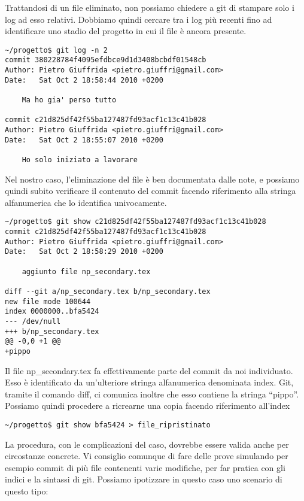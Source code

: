 \documentclass[a4paper,12pt,oneside]{article}
\begin{document}
Trattandosi di un file eliminato, non possiamo chiedere a git di stampare solo i
log ad esso relativi. Dobbiamo quindi cercare tra i log più recenti fino ad
identificare uno stadio del progetto in cui il file è ancora presente.

\begin{lstlisting}
~/progetto$ git log -n 2
commit 380228784f4095efdbce9d1d3408bcbdf01548cb
Author: Pietro Giuffrida <pietro.giuffri@gmail.com>
Date:   Sat Oct 2 18:58:44 2010 +0200

    Ma ho gia' perso tutto

commit c21d825df42f55ba127487fd93acf1c13c41b028
Author: Pietro Giuffrida <pietro.giuffri@gmail.com>
Date:   Sat Oct 2 18:55:07 2010 +0200

    Ho solo iniziato a lavorare
\end{lstlisting}

Nel nostro caso, l'eliminazione del file è ben documentata dalle note, e
possiamo quindi subito verificare il contenuto del commit facendo riferimento
alla stringa alfanumerica che lo identifica univocamente.

\begin{lstlisting}
~/progetto$ git show c21d825df42f55ba127487fd93acf1c13c41b028
commit c21d825df42f55ba127487fd93acf1c13c41b028
Author: Pietro Giuffrida <pietro.giuffri@gmail.com>
Date:   Sat Oct 2 18:58:29 2010 +0200

    aggiunto file np_secondary.tex

diff --git a/np_secondary.tex b/np_secondary.tex
new file mode 100644
index 0000000..bfa5424
--- /dev/null
+++ b/np_secondary.tex
@@ -0,0 +1 @@
+pippo
\end{lstlisting}

Il file np\_secondary.tex fa effettivamente parte del commit da noi
individuato. Esso è identificato da un'ulteriore stringa alfanumerica
denominata index. Git, tramite il comando diff, ci comunica inoltre che esso
contiene la stringa ``pippo''.
Possiamo quindi procedere a ricrearne una copia facendo riferimento all'index

\begin{lstlisting}
~/progetto$ git show bfa5424 > file_ripristinato
\end{lstlisting}

La procedura, con le complicazioni del caso, dovrebbe essere valida anche per
circostanze concrete. Vi consiglio comunque di fare delle prove simulando per
esempio commit di più file contenenti varie modifiche, per far pratica con gli
indici e la sintassi di git.
Possiamo ipotizzare in questo caso uno scenario di questo tipo:
\end{document}
